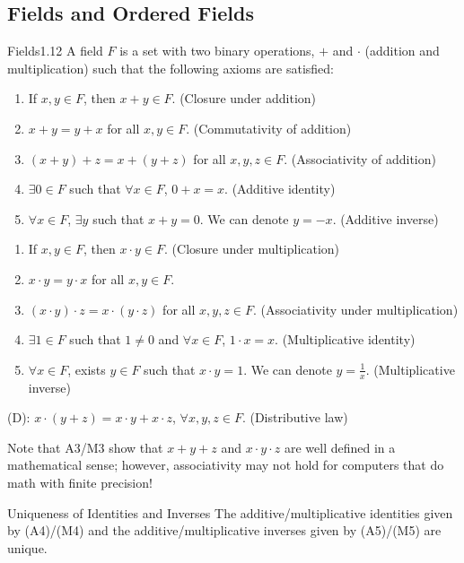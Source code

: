\subsection{Fields and Ordered Fields}
\begin{definition}{Fields}{1.12}
    A field $F$ is a set with two binary operations, $+$ and $\cdot$ (addition and multiplication) such that the following axioms are satisfied:
    \begin{enumerate}[start=1, label={(A\arabic*):}]
    \item If $x, y \in F$, then $x + y \in F$. (Closure under addition)
    \item $x + y = y + x$ for all $x, y \in F$. (Commutativity of addition)
    \item $(x+y) + z = x + (y + z)$ for all $x, y, z \in F$. (Associativity of addition)
    \item $\exists 0 \in F$ such that $\forall x \in F$, $0 + x = x$. (Additive identity)
    \item $\forall x \in F$, $\exists y$ such that $x + y = 0$. We can denote $y = -x$. (Additive inverse)
    \end{enumerate}
    \begin{enumerate}[start=1, label={(M\arabic*):}]
        \item If $x, y \in F$, then $x\cdot y\in F$. (Closure under multiplication)
        \item $x \cdot y = y \cdot x$ for all $x, y \in F$.
        \item $(x\cdot y)\cdot z = x \cdot (y \cdot z)$ for all $x, y, z \in F$. (Associativity under multiplication)
        \item $\exists 1 \in F$ such that $1 \neq 0$ and $\forall x \in F$, $1 \cdot x = x$. (Multiplicative identity)
        \item $\forall x \in F$, exists $y \in F$ such that $x \cdot y = 1$. We can denote $y = \frac{1}{x}$. (Multiplicative inverse)
    \end{enumerate}
    (D): $x \cdot (y + z) = x \cdot y + x \cdot z$, $\forall x, y, z \in F$. (Distributive law)
\end{definition}
Note that A3/M3 show that $x + y + z$ and $x\cdot y\cdot z$ are well defined in a mathematical sense; however, associativity may not hold for computers that do math with finite precision! 
\begin{ntheorem}{Uniqueness of Identities and Inverses}
    The additive/multiplicative identities given by (A4)/(M4) and the additive/multiplicative inverses given by (A5)/(M5) are unique. 
\end{ntheorem}
